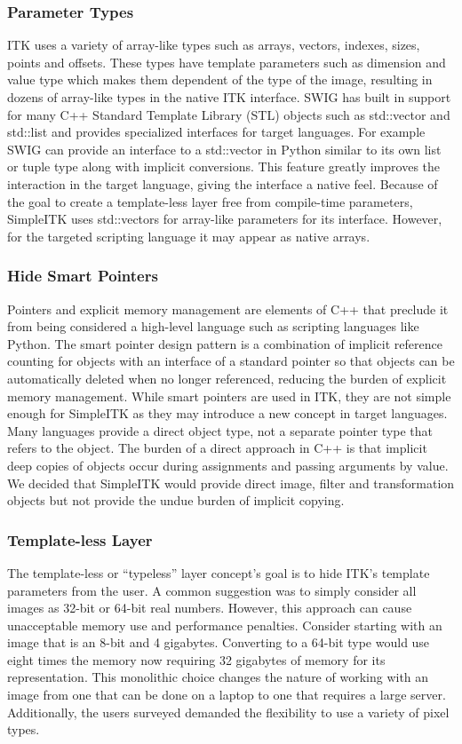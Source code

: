 \documentclass{frontiersMED} %
\begin{document}
\subsubsection{Parameter Types}
ITK uses a variety of array-like types such as arrays, vectors,
indexes, sizes, points and offsets. These types have template
parameters such as dimension and value type which makes them dependent
of the type of the image, resulting in dozens of array-like types in
the native ITK interface. SWIG has built in support for many C++
Standard Template Library (STL) objects such as std::vector and
std::list and provides specialized interfaces for target
languages. For example SWIG can provide an interface to a std::vector
in Python similar to its own list or tuple type along with implicit
conversions. This feature greatly improves the interaction in the
target language, giving the interface a native feel. Because of the
goal to create a template-less layer free from compile-time
parameters, SimpleITK uses std::vectors for array-like parameters for
its interface. However, for the targeted scripting language it may
appear as native arrays.

\subsubsection{Hide Smart Pointers}
Pointers and explicit memory management are elements of C++ that
preclude it from being considered a high-level language such as
scripting languages like Python. The smart pointer design pattern is a
combination of implicit reference counting for objects with an
interface of a standard pointer so that objects can be automatically
deleted when no longer referenced, reducing the burden of explicit
memory management. While smart pointers are used in ITK, they are not
simple enough for SimpleITK as they may introduce a new concept in
target languages. Many languages provide a direct object type, not a
separate pointer type that refers to the object. The burden of a
direct approach in C++ is that implicit deep copies of objects occur
during assignments and passing arguments by value. We decided that
SimpleITK would provide direct image, filter and transformation
objects but not provide the undue burden of implicit copying.

\subsubsection{Template-less Layer}
The template-less or “typeless” layer concept's goal is to hide ITK's
template parameters from the user. A common suggestion was to simply
consider all images as 32-bit or 64-bit real numbers. However, this
approach can cause unacceptable memory use and performance
penalties. Consider starting with an image that is an 8-bit and 4
gigabytes.  Converting to a 64-bit type would use eight times the
memory now requiring 32 gigabytes of memory for its
representation. This monolithic choice changes the nature of working
with an image from one that can be done on a laptop to one that
requires a large server. Additionally, the users surveyed demanded the
flexibility to use a variety of pixel types.
\end{document}
